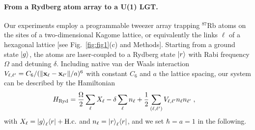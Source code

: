 \documentclass[footinbib,a4paper,aps,superscriptaddress,twocolumn,preprintnumbers,amsmath,amssymb,nobalancelastpage,10pt,prl]{revtex4-2}
\begin{document}
\paragraph{From a Rydberg atom array to a U(1) LGT.}
Our experiments employ a programmable 
tweezer array trapping ${}^{87}$Rb atoms on the sites of a two-dimensional Kagome lattice, or equivalently the links $\ell$ of a hexagonal lattice [see Fig.~\ref{fig:fig1}(c) and Methods].
Starting from a ground state $\ket{g}$, the atoms are laser-coupled to a Rydberg state $\ket{r}$ with Rabi frequency $\Omega$ and detuning $\delta$. 
Including native van der Waals interaction $V_{\ell,\ell^\prime} = C_6 / (\|{\bf x}_\ell - {\bf x}_{\ell^\prime}\|/a)^6$ with constant $C_6$ and $a$ the lattice spacing, our system can be described by the Hamiltonian
\begin{equation}
\label{eq:Rydberg_H}
\begin{aligned}
H_{\rm Ryd} & = \frac{\Omega}{2}\sum_\ell X_\ell - \delta \sum_\ell n_\ell+ \frac{1}{2}\sum_{(\ell, \ell^\prime)} V_{\ell,\ell^\prime} n_\ell n_{\ell^\prime} \;,
\end{aligned}
\end{equation}
with $X_\ell = \ket{g}_\ell\!\bra{r} + {\rm H.c.}$ and $n_\ell = \ket{r}_\ell\!\bra{r}$, and we set $\hbar = a = 1$ in the following.
\end{document}
